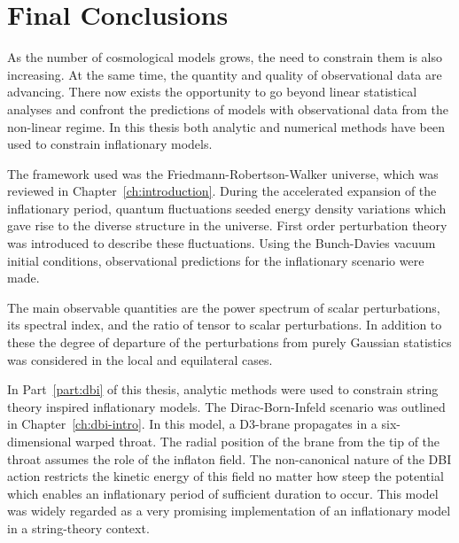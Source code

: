 \renewcommand{\CVSrevision}%
{\version$Id: theend.tex,v 1.9 2009/11/09 19:38:46 ith Exp $}

\chapter{Final Conclusions}
\label{ch:conclusions}

As the number of cosmological models grows, the need to constrain them is also
increasing. At the same time, the quantity and quality of observational data are
advancing. There now exists the opportunity to go beyond linear statistical analyses
and confront the predictions of models with observational data from the non-linear
regime. In this thesis both analytic and numerical methods have been used to
constrain inflationary models.

The framework used was the Friedmann-Robertson-Walker universe, which was reviewed
in Chapter~\ref{ch:introduction}. During the accelerated expansion of the
inflationary period, quantum fluctuations seeded energy density variations which
gave rise to the diverse structure in the universe. First order perturbation theory
was introduced to describe these fluctuations. Using the Bunch-Davies vacuum initial
conditions, observational predictions for the inflationary scenario were made.

The main observable quantities are the power spectrum of scalar perturbations, its
spectral index, and the ratio of tensor to scalar perturbations. In addition to
these the degree of departure of the perturbations from purely Gaussian statistics
was considered in the local and equilateral cases.


\pagebreak

In Part~\ref{part:dbi} of this thesis, analytic methods were used to constrain
string theory inspired inflationary models. The Dirac-Born-Infeld scenario was
outlined in Chapter~\ref{ch:dbi-intro}. In this model, a D3-brane propagates in a
six-dimensional warped throat. The radial position of the brane from the tip of the
throat assumes the role of the inflaton field. The non-canonical nature of the DBI
action restricts the kinetic energy of this field no matter how steep the potential
which enables an inflationary period of sufficient duration to occur.
This model was widely regarded as a very promising implementation of an inflationary
model in a string-theory context.

